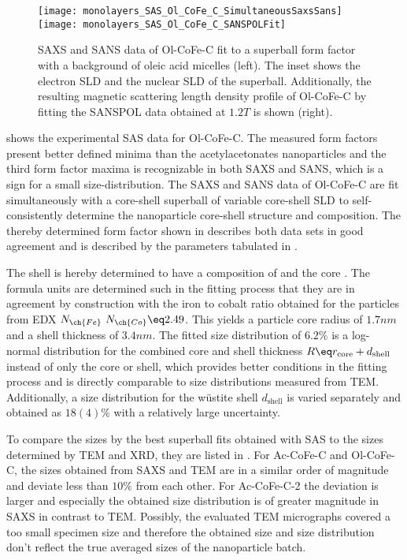 \documentclass[\main/dresen_thesis.tex]{subfiles}
\begin{document}
    \begin{figure}[tb]
      \centering
      \texttt{[image: monolayers\_SAS\_Ol\_CoFe\_C\_SimultaneousSaxsSans]}
      \texttt{[image: monolayers\_SAS\_Ol\_CoFe\_C\_SANSPOLFit]}
      \caption{\label{fig:monolayers:nanoparticle:sas:OlCoFeC}SAXS and SANS data of Ol-CoFe-C fit to a superball form factor with a background of oleic acid micelles (left). The inset shows the electron SLD and the nuclear SLD of the superball. Additionally, the resulting magnetic scattering length density profile of Ol-CoFe-C by fitting the SANSPOL data obtained at $1.2 \unit{T}$ is shown (right).}
    \end{figure}

     shows the experimental SAS data for Ol-CoFe-C.
    The measured form factors present better defined minima than the acetylacetonates nanoparticles and the third form factor maxima is recognizable in both SAXS and SANS, which is a sign for a small size-distribution.
    The SAXS and SANS data of Ol-CoFe-C are fit simultaneously with a core-shell superball of variable core-shell SLD to self-consistently determine the nanoparticle core-shell structure and composition.
    The thereby determined form factor shown in  describes both data sets in good agreement and is described by the parameters tabulated in .

    The shell is hereby determined to have a composition of  and the core .
    The formula units are determined such in the fitting process that they are in agreement by construction with the iron to cobalt ratio obtained for the particles from EDX $N_{\ch{Fe}} \ N_{\ch{Co}} \eq 2.49$.
    This yields a particle core radius of $1.7 \unit{nm}$ and a shell thickness of $3.4 \unit{nm}$.
    The fitted size distribution of $6.2 \%$ is a log-normal distribution for the combined core and shell thickness $R \eq r_\mathrm{core} + d_\mathrm{shell}$ instead of only the core or shell, which provides better conditions in the fitting process and is directly comparable to size distributions measured from TEM.
    Additionally, a size distribution for the w\"ustite shell $d_\mathrm{shell}$ is varied separately and obtained as $18(4) \%$ with a relatively large uncertainty.

    To compare the sizes by the best superball fits obtained with SAS to the sizes determined by TEM and XRD, they are listed in .
    For Ac-CoFe-C and Ol-CoFe-C, the sizes obtained from SAXS and TEM are in a similar order of magnitude and deviate less than $10 \%$ from each other.
    For Ac-CoFe-C-2 the deviation is larger and especially the obtained size distribution is of greater magnitude in SAXS in contrast to TEM.
    Possibly, the evaluated TEM micrographs covered a too small specimen size and therefore the obtained size and size distribution don't reflect the true averaged sizes of the nanoparticle batch.
\end{document}
